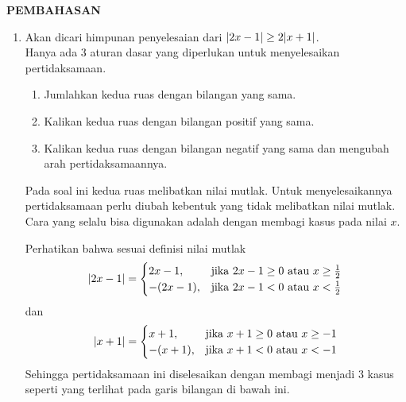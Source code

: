 \newpage
\begin{center}
    \textbf{\large{PEMBAHASAN}}
\end{center}
\begin{enumerate}[leftmargin=*, label={\arabic*}.]
\item Akan dicari himpunan penyelesaian dari $\lvert2x-1\rvert \geq 2\lvert x+1\rvert$.\\
Hanya ada 3 aturan dasar yang diperlukan untuk menyelesaikan pertidaksamaan.
\begin{enumerate}[label={\arabic*})]
    \item Jumlahkan kedua ruas dengan bilangan yang sama.
    \item Kalikan kedua ruas dengan bilangan positif yang sama.
    \item Kalikan kedua ruas dengan bilangan negatif yang sama dan 
    mengubah arah pertidaksamaannya.
\end{enumerate}
Pada soal ini kedua ruas melibatkan nilai mutlak. Untuk menyelesaikannya 
pertidaksamaan perlu diubah kebentuk yang tidak melibatkan nilai mutlak. 
Cara yang selalu bisa digunakan adalah dengan membagi kasus pada nilai $x$.

Perhatikan bahwa sesuai definisi nilai mutlak
\[
\lvert2x-1\rvert = 
\begin{cases}
    2x-1, &\text{jika $2x-1 \geq 0$ atau $x \geq \frac{1}{2}$}\\
    -(2x-1), &\text{jika $2x-1 < 0$ atau $x < \frac{1}{2}$}
\end{cases}
\]
dan
\[
\lvert x+1\rvert = 
\begin{cases}
    x+1, &\text{jika $x+1 \geq 0$ atau $x \geq -1$}\\
    -(x+1), &\text{jika $x+1 < 0$ atau $x < -1$}
\end{cases}
\]
Sehingga pertidaksamaan ini diselesaikan dengan membagi menjadi 3 kasus seperti 
yang terlihat pada garis bilangan di bawah ini.

\vspace{0.2cm}
\end{enumerate}
